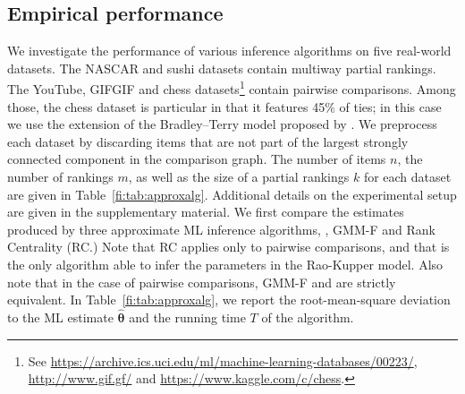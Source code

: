 \subsection{Empirical performance}

We investigate the performance of various inference algorithms on five real-world datasets.
The NASCAR \citep{hunter2004mm} and sushi \citep{kamishima2009efficient} datasets contain multiway partial rankings.
The YouTube, GIFGIF and chess datasets\footnote{
See \url{https://archive.ics.uci.edu/ml/machine-learning-databases/00223/}, \url{http://www.gif.gf/} and \url{https://www.kaggle.com/c/chess}.
} contain pairwise comparisons.
Among those, the chess dataset is particular in that it features 45\% of ties;
in this case we use the extension of the Bradley--Terry model proposed by \citet{rao1967ties}.
We preprocess each dataset by discarding items that are not part of the largest strongly connected component in the comparison graph.
The number of items $n$, the number of rankings $m$, as well as the size of a partial rankings $k$ for each dataset are given in Table~\ref{fi:tab:approxalg}.
Additional details on the experimental setup are given in the supplementary material.
We first compare the estimates produced by three approximate ML inference algorithms, \LSR{}, GMM-F and Rank Centrality (RC.)
Note that RC applies only to pairwise comparisons, and that \LSR{} is the only algorithm able to infer the parameters in the Rao-Kupper model.
Also note that in the case of pairwise comparisons, GMM-F and \LSR{} are strictly equivalent.
In Table~\ref{fi:tab:approxalg}, we report the root-mean-square deviation to the ML estimate $\hat{\bm{\theta}}$ and the running time $T$ of the algorithm.

